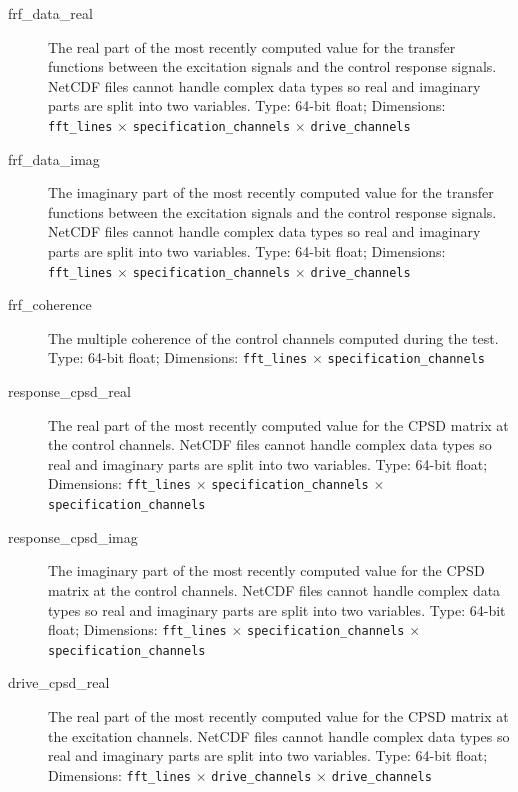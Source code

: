\documentclass[pdf,12pt,report]{SANDreport}
\newcommand{\inlineCode}{\lstinline[basicstyle=\bfseries\ttfamily]}
\begin{document}
    \begin{description}
        \item[frf\_data\_real] The real part of the most recently computed value for the transfer functions between the excitation signals and the control response signals.  NetCDF files cannot handle complex data types so real and imaginary parts are split into two variables.  Type: 64-bit float; Dimensions: \inlineCode{fft_lines} $\times$ \inlineCode{specification_channels} $\times$ \inlineCode{drive_channels}
        
        \item[frf\_data\_imag] The imaginary part of the most recently computed value for the transfer functions between the excitation signals and the control response signals.  NetCDF files cannot handle complex data types so real and imaginary parts are split into two variables.  Type: 64-bit float; Dimensions: \inlineCode{fft_lines} $\times$ \inlineCode{specification_channels} $\times$ \inlineCode{drive_channels}
        
        \item[frf\_coherence] The multiple coherence of the control channels computed during the test.  Type: 64-bit float; Dimensions: \inlineCode{fft_lines} $\times$ \inlineCode{specification_channels}
        
        \item[response\_cpsd\_real] The real part of the most recently computed value for the \ac{CPSD} matrix at the control channels.  NetCDF files cannot handle complex data types so real and imaginary parts are split into two variables.  Type: 64-bit float; Dimensions: \inlineCode{fft_lines} $\times$ \inlineCode{specification_channels} $\times$ \inlineCode{specification_channels}
        
        \item[response\_cpsd\_imag] The imaginary part of the most recently computed value for the \ac{CPSD} matrix at the control channels.  NetCDF files cannot handle complex data types so real and imaginary parts are split into two variables.  Type: 64-bit float; Dimensions: \inlineCode{fft_lines} $\times$ \inlineCode{specification_channels} $\times$ \inlineCode{specification_channels}
        
        \item[drive\_cpsd\_real] The real part of the most recently computed value for the \ac{CPSD} matrix at the excitation channels.  NetCDF files cannot handle complex data types so real and imaginary parts are split into two variables.  Type: 64-bit float; Dimensions: \inlineCode{fft_lines} $\times$ \inlineCode{drive_channels} $\times$ \inlineCode{drive_channels}
        

\end{description}
\end{document}
